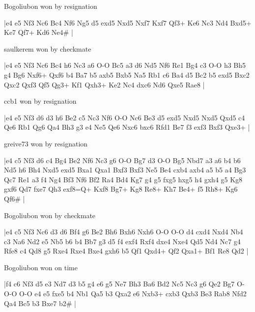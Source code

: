 \showboard

Bogoliubon won by resignation

\makegametitle
|e4 e5 Nf3 Nc6 Bc4 Nf6 Ng5 d5 exd5 Nxd5 Nxf7 Kxf7 Qf3+ Ke6 Nc3 Nd4 Bxd5+ Ke7 Qf7+ Kd6 Ne4\#  |

\showboard

saulkerem won by checkmate

\makegametitle
|e4 e5 Nf3 Nc6 Bc4 h6 Nc3 a6 O-O Bc5 a3 d6 Nd5 Nf6 Re1 Bg4 c3 O-O h3 Bh5 g4 Bg6 Nxf6+ Qxf6 b4 Ba7 b5 axb5 Bxb5 Na5 Rb1 c6 Ba4 d5 Bc2 b5 exd5 Bxc2 Qxc2 Qxf3 Qf5 Qg3+ Kf1 Qxh3+ Ke2 Nc4 dxc6 Nd6 Qxe5 Rae8  |

\showboard

ccb1 won by resignation

\makegametitle
|e4 e5 Nf3 d6 d3 h6 Be2 c5 Nc3 Nf6 O-O Nc6 Be3 d5 exd5 Nxd5 Nxd5 Qxd5 c4 Qe6 Rb1 Qg6 Qa4 Bh3 g3 e4 Ne5 Qe6 Nxc6 bxc6 Rfd1 Be7 f3 exf3 Bxf3 Qxe3+  |

\showboard

greive73 won by resignation

\makegametitle
|e4 c5 Nf3 d6 c4 Bg4 Be2 Nf6 Nc3 g6 O-O Bg7 d3 O-O Bg5 Nbd7 a3 a6 b4 b6 Nd5 h6 Bh4 Nxd5 exd5 Bxa1 Qxa1 Bxf3 Bxf3 Ne5 Be4 cxb4 axb4 a5 b5 a4 Bg3 Qc7 Re1 a3 f4 Ng4 Bf3 Nf6 Bf2 Ra4 Bd4 Kg7 g4 g5 fxg5 hxg5 h4 gxh4 g5 Kg8 gxf6 Qd7 fxe7 Qh3 exf8=Q+ Kxf8 Bg7+ Kg8 Re8+ Kh7 Be4+ f5 Rh8+ Kg6 Qf6\#  |

\showboard

Bogoliubon won by checkmate

\makegametitle
|e4 c5 Nf3 Nc6 d3 d6 Bf4 g6 Be2 Bh6 Bxh6 Nxh6 O-O O-O d4 cxd4 Nxd4 Nb4 c3 Na6 Nd2 e5 Nb5 b6 b4 Bb7 g3 d5 f4 exf4 Rxf4 dxe4 Nxe4 Qd5 Nd4 Nc7 g4 Rfe8 c4 Qd8 g5 Rxe4 Rxe4 Bxe4 gxh6 b5 Qf1 Qxd4+ Qf2 Qxa1+ Bf1 Re8 Qd2  |

\showboard

Bogoliubon won on time

\makegametitle
|f4 c6 Nf3 d5 e3 Nd7 d3 b5 g4 e6 g5 Ne7 Bh3 Ba6 Bd2 Nc5 Nc3 g6 Qe2 Bg7 O-O-O O-O e4 e5 fxe5 b4 Nb1 Qa5 b3 Qxa2 e6 Nxb3+ cxb3 Qxb3 Be3 Rab8 Nfd2 Qa4 Bc5 b3 Bxe7 b2\#  |

